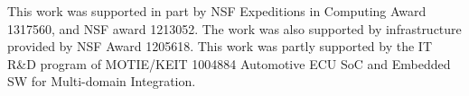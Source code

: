 This work was supported in part  by NSF Expeditions in Computing Award 1317560, and NSF award 1213052. The work was also supported by infrastructure provided by NSF Award 1205618. This work was partly supported by the IT R\&D program of MOTIE/KEIT 1004884 Automotive ECU SoC and Embedded SW for Multi-domain Integration.
